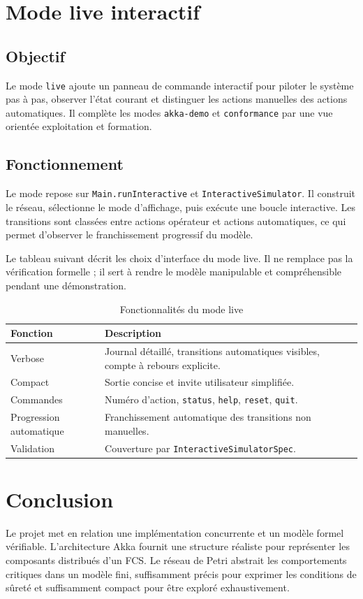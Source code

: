 \documentclass[11pt,a4paper]{report}
\begin{document}
\chapter{Mode live interactif}

\section{Objectif}
Le mode \texttt{live} ajoute un panneau de commande interactif pour piloter le système pas à pas, observer l'état courant et distinguer les actions manuelles des actions automatiques. Il complète les modes \texttt{akka-demo} et \texttt{conformance} par une vue orientée exploitation et formation.

\section{Fonctionnement}
Le mode repose sur \texttt{Main.runInteractive} et \texttt{InteractiveSimulator}. Il construit le réseau, sélectionne le mode d'affichage, puis exécute une boucle interactive. Les transitions sont classées entre actions opérateur et actions automatiques, ce qui permet d'observer le franchissement progressif du modèle.

Le tableau suivant décrit les choix d'interface du mode live. Il ne remplace pas la vérification formelle ; il sert à rendre le modèle manipulable et compréhensible pendant une démonstration.

\begin{table}[H]
\centering
\caption{Fonctionnalités du mode live}
\begin{tabularx}{\textwidth}{lY}
\toprule
Fonction & Description \\
\midrule
Verbose & Journal détaillé, transitions automatiques visibles, compte à rebours explicite. \\
Compact & Sortie concise et invite utilisateur simplifiée. \\
Commandes & Numéro d'action, \texttt{status}, \texttt{help}, \texttt{reset}, \texttt{quit}. \\
Progression automatique & Franchissement automatique des transitions non manuelles. \\
Validation & Couverture par \texttt{InteractiveSimulatorSpec}. \\
\bottomrule
\end{tabularx}
\end{table}

\chapter{Conclusion}
Le projet met en relation une implémentation concurrente et un modèle formel vérifiable. L'architecture Akka fournit une structure réaliste pour représenter les composants distribués d'un FCS. Le réseau de Petri abstrait les comportements critiques dans un modèle fini, suffisamment précis pour exprimer les conditions de sûreté et suffisamment compact pour être exploré exhaustivement.
\end{document}
